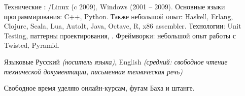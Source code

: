 \documentclass[unicode, 10pt, a4paper, oneside, fleqn]{article}
\begin{document}

\inlineheadsection  %
  {Технические}
  {: /Linux (c 2009), Windows (2001 -- 2009).
   Основные языки программирования: C++, Python.
   Также небольшой опыт: Haskell, Erlang, Clojure, Scala, Lua, AutoIt,
   Java, Octave, R, x86 assembler.
   Технологии: Unit Testing, паттерны проектирования, .
   Фреймворки: небольшой опыт работы с Twisted, Pyramid.
  }

\inlineheadsection
  {Языковые}
  {Русский \emph{(носитель языка)}, English \emph{(средний: свободное чтение
   технической документации, письменная техническая речь)}}

\spacedhrule{1.6em}{-0.4em}


\inlineheadsection
  {}
  {Свободное время уделяю онлайн-курсам, фугам Баха и штанге.}
\end{document}
